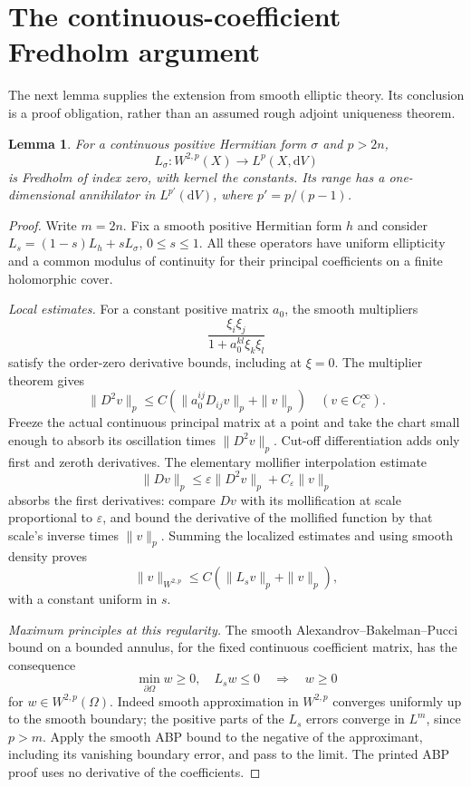 \documentclass[11pt]{article}
\newcommand{\dV}{\mathrm dV}
\newtheorem{lemma}[theorem]{Lemma}
\theoremstyle{remark}
\begin{document}
\section{The continuous-coefficient Fredholm argument}
The next lemma supplies the extension from smooth elliptic theory. Its
conclusion is a proof obligation, rather than an assumed rough adjoint
uniqueness theorem.

\begin{lemma}\label{lem:fredholm}
For a continuous positive Hermitian form $\sigma$ and $p>2n$,
\[
 L_\sigma:W^{2,p}(X)\longrightarrow L^p(X,\dV)
\]
is Fredholm of index zero, with kernel the constants. Its range has a
one-dimensional annihilator in $L^{p'}(\dV)$, where $p'=p/(p-1)$.
\end{lemma}
\begin{proof}
Write $m=2n$. Fix a smooth positive Hermitian form $h$ and consider
$L_s=(1-s)L_h+sL_\sigma$, $0\leq s\leq1$. All these operators have
uniform ellipticity and a common modulus of continuity for their principal
coefficients on a finite holomorphic cover.

\emph{Local estimates.}
For a constant positive matrix $a_0$, the smooth multipliers
\[
 \frac{\xi_i\xi_j}{1+a_0^{kl}\xi_k\xi_l}
\]
satisfy the order-zero derivative bounds, including at $\xi=0$.
The multiplier theorem \cite[Chapter 13, Theorem 5.1]{Taylor} gives
\[
 \|D^2v\|_p\leq C(\|a_0^{ij}D_{ij}v\|_p+\|v\|_p)
 \quad(v\in C_c^\infty).
\]
Freeze the actual continuous principal matrix at a point and take the
chart small enough to absorb its oscillation times $\|D^2v\|_p$.
Cut-off differentiation adds only first and zeroth derivatives. The
elementary mollifier interpolation estimate
\[
 \|Dv\|_p\leq\varepsilon\|D^2v\|_p+C_\varepsilon\|v\|_p
\]
absorbs the first derivatives: compare $Dv$ with its mollification at
scale proportional to $\varepsilon$, and bound the derivative of the
mollified function by that scale's inverse times $\|v\|_p$.
Summing the localized estimates and using smooth density proves
\begin{equation}\label{eq:estimate}
 \|v\|_{W^{2,p}}\leq C(\|L_sv\|_p+\|v\|_p),
\end{equation}
with a constant uniform in $s$.

\emph{Maximum principles at this regularity.}
The smooth Alexandrov--Bakelman--Pucci bound on a bounded annulus, for
the fixed continuous coefficient matrix, has the consequence
\[
 \min_{\partial\Omega}w\geq0,\quad L_sw\leq0
       \quad\Longrightarrow\quad w\geq0
\]
for $w\in W^{2,p}(\Omega)$. Indeed smooth approximation in $W^{2,p}$
converges uniformly up to the smooth boundary; the positive parts of the
$L_s$ errors converge in $L^m$, since $p>m$. Apply the smooth ABP bound
to the negative of the approximant, including its vanishing boundary
error, and pass to the limit. The printed ABP proof
\cite[Chapter 14, Proposition 13.1 and Lemma 13.2]{Taylor} uses no
derivative of the coefficients.


\end{proof}
\end{document}
